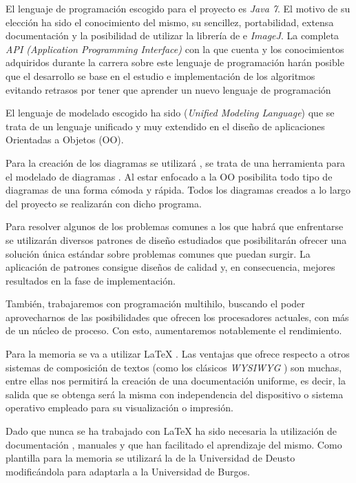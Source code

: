 El lenguaje de programación escogido para el proyecto es \textit{Java 7}. El motivo de su elección ha sido el conocimiento del mismo, su sencillez, portabilidad, extensa documentación y la posibilidad de utilizar la librería de \weka{} e \textit{ImageJ}. La completa \textit{API (Application Programming Interface)} con la que cuenta y los conocimientos adquiridos durante la carrera sobre este lenguaje de programación harán posible que el desarrollo se base en el estudio e implementación de los algoritmos evitando retrasos por tener que aprender un nuevo lenguaje de programación

El lenguaje de modelado escogido ha sido \uml{} (\textit{Unified Modeling Language}) que se trata de un lenguaje unificado y muy extendido en el diseño de aplicaciones Orientadas a Objetos (OO).

Para la creación de los diagramas se utilizará \jude{}, se trata de una herramienta para el modelado de diagramas \uml{}. Al estar enfocado a la OO posibilita todo tipo de diagramas de una forma cómoda y rápida. Todos los diagramas creados a lo largo del proyecto se realizarán con dicho programa.

Para resolver algunos de los problemas comunes a los que habrá que enfrentarse se utilizarán diversos patrones de diseño \cite{patrones} estudiados que posibilitarán ofrecer una solución única estándar sobre problemas comunes que puedan surgir. La aplicación de patrones consigue diseños de calidad y, en consecuencia, mejores resultados en la fase de implementación.

También, trabajaremos con programación multihilo, buscando el poder aprovecharnos de las posibilidades que ofrecen los procesadores actuales, con más de un núcleo de proceso. Con esto, aumentaremos notablemente el rendimiento.

Para la memoria se va a utilizar \LaTeX{} . Las ventajas que ofrece respecto a otros sistemas de composición de textos (como los clásicos \textit{WYSIWYG} ) son muchas, entre ellas nos permitirá la creación de una documentación uniforme, es decir, la salida que se obtenga será la misma con independencia del dispositivo o sistema operativo empleado para su visualización o impresión.

Dado que nunca se ha trabajado con \LaTeX{} ha sido necesaria la utilización de documentación , manuales  y  que han facilitado el aprendizaje del mismo. Como plantilla para la memoria se utilizará la de la Universidad de Deusto  modificándola para adaptarla a la Universidad de Burgos.

